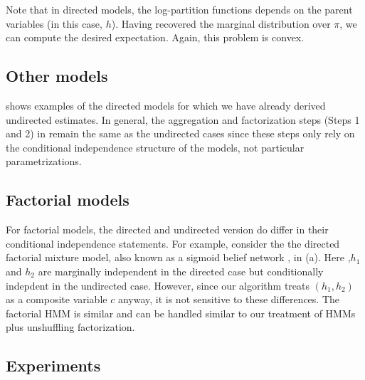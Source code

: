 Note that in directed models, the log-partition functions depends on the parent variables (in this case, $h$).
Having recovered the marginal distribution over $\pi$, we can compute the desired expectation.
Again, this problem is convex.



\subsection{Other models}

 shows examples of the directed models
for which we have already derived undirected estimates.
In general, the aggregation
and factorization steps (Steps 1 and 2) in 
remain the same as the undirected cases since these steps
only rely on the conditional independence structure of the models,
not particular parametrizations.

\subsection{Factorial models}

For factorial models, the directed and undirected version do differ in their
conditional independence statements.
For example, consider the 
the directed factorial mixture model,
also known as a sigmoid belief network \citep{saul96sigmoid},
in (a).
Here ,$h_1$ and $h_2$ are marginally independent in the directed
case but conditionally indepdent in the undirected case.
However, since our algorithm treats $(h_1,h_2)$ as a composite variable $c$
anyway, it is not sensitive to these differences.
The factorial HMM \cite{ghahramani97fhmm} is similar and can be handled
similar to our treatment of HMMs plus unshuffling factorization.

\subsection{Experiments}

